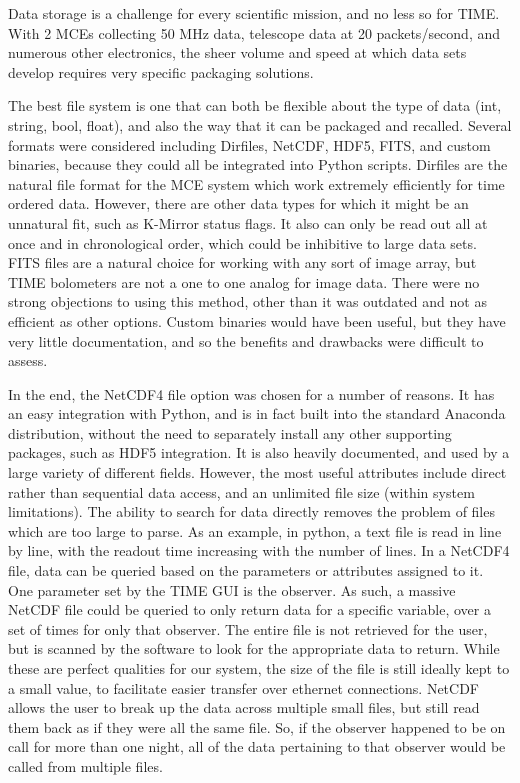 \documentclass[manuscript]{aastex}
\begin{document}
Data storage is a challenge for every scientific mission, and no less so for TIME. With 2 MCEs collecting 50 MHz data, telescope data at 20 packets/second, and numerous other electronics, the sheer volume and speed at which data sets develop requires very specific packaging solutions. 

The best file system is one that can both be flexible about the type of data (int, string, bool, float), and also the way that it can be packaged and recalled. Several formats were considered including Dirfiles, NetCDF, HDF5, FITS, and custom binaries, because they could all be integrated into Python scripts. Dirfiles are the natural file format for the MCE system which work extremely efficiently for time ordered data. However, there are other data types for which it might be an unnatural fit, such as K-Mirror status flags. It also can only be read out all at once and in chronological order, which could be inhibitive to large data sets. FITS files are a natural choice for working with any sort of image array, but TIME bolometers are not a one to one analog for image data. There were no strong objections to using this method, other than it was outdated and not as efficient as other options. Custom binaries would have been useful, but they have very little documentation, and so the benefits and drawbacks were difficult to assess. 

In the end, the NetCDF4 file option was chosen for a number of reasons. It has an easy integration with Python, and is in fact built into the standard {\sc Anaconda} distribution, without the need to separately install any other supporting packages, such as HDF5 integration. It is also heavily documented, and used by a large variety of different fields. However, the most useful attributes include direct rather than sequential data access, and an unlimited file size (within system limitations). The ability to search for data directly removes the problem of files which are too large to parse. As an example, in python, a text file is read in line by line, with the readout time increasing with the number of lines. In a NetCDF4 file, data can be queried based on the parameters or attributes assigned to it. One parameter set by the TIME GUI is the observer. As such, a massive NetCDF file could be queried to only return data for a specific variable, over a set of times for only that observer. The entire file is not retrieved for the user, but is scanned by the software to look for the appropriate data to return. While these are perfect qualities for our system, the size of the file is still ideally kept to a small value, to facilitate easier transfer over ethernet connections. NetCDF allows the user to break up the data across multiple small files, but still read them back as if they were all the same file. So, if the observer happened to be on call for more than one night, all of the data pertaining to that observer would be called from multiple files. 
\end{document}
